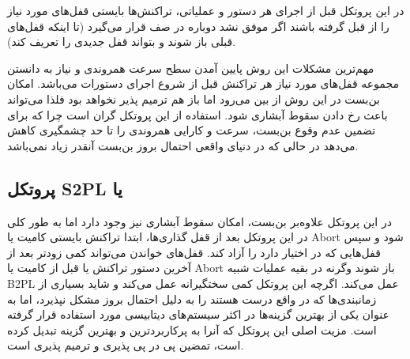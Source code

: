 \documentclass[a4paper]{article}
\begin{document}
در این پروتکل قبل از اجرای هر دستور و عملیاتی، تراکنش‌ها بایستی قفل‌های مورد
نیاز را از قبل گرفته باشند اگر موفق نشد دوباره در صف قرار می‌گیرد (تا اینکه
قفل‌های قبلی باز شوند و بتواند قفل جدیدی را تعریف کند).

\begin{LTR}
    \begin{table}[h]
        \begin{RTL}
            \caption{زمانبندی $S_{7}$}
        \end{RTL}
        \centering
    \end{table}
\end{LTR}

مهم‌ترین مشکلات این روش پایین آمدن سطح سرعت همروندی و نیاز به دانستن مجموعه
قفل‌های مورد نیاز هر تراکنش قبل از شروع اجرای دستورات می‌باشد. امکان بن‌بست در
این روش از بین می‌رود اما باز هم ترمیم پذیر نخواهد بود فلذا می‌تواند باعث رخ
دادن سقوط آبشاری شود. استفاده از این پروتکل گران است چرا که برای تضمین عدم وقوع
بن‌بست، سرعت و کارایی همروندی را تا حد چشمگیری کاهش می‌دهد در حالی که در دنیای
واقعی احتمال بروز بن‌بست آنقدر زیاد نمی‌باشد.

\newpage

\subsection{پروتکل S2PL یا }

در این پروتکل علاوه‌بر بن‌بست، امکان سقوط آبشاری نیز وجود دارد اما به طور کلی در
این پروتکل بعد از قفل گذاری‌ها، ابتدا تراکنش بایستی کامیت یا Abort شود و سپس
قفل‌هایی که در اختیار دارد را آزاد کند. قفل‌های خواندن می‌تواند کمی زودتر بعد از
آخرین دستور تراکنش یا قبل از کامیت یا Abort باز شوند وگرنه در بقیه عملیات شبیه
B2PL عمل می‌کند. اگرچه این پروتکل کمی سختگیرانه عمل می‌کند و شاید بسیاری از
زمانبندی‌ها که در واقع درست هستند را به دلیل احتمال بروز مشکل نپذیرد، اما به
عنوان یکی از بهترین گزینه‌ها در اکثر سیستم‌های دیتابیسی مورد استفاده قرار گرفته
است. مزیت اصلی این پروتکل که آنرا به پرکاربردترین و بهترین گزینه تبدیل کرده است،
تمضین پی در پی پذیری و ترمیم پذیری است.
\end{document}
